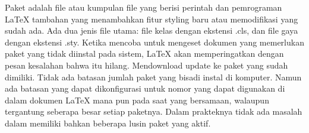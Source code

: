 \hspace{0.50in} Paket adalah file atau kumpulan file yang berisi perintah dan pemrograman LaTeX tambahan yang menambahkan fitur styling baru atau memodifikasi yang sudah ada. Ada dua jenis file utama: file kelas dengan ekstensi .cls, dan file gaya dengan ekstensi .sty. Ketika mencoba untuk mengeset dokumen yang memerlukan paket yang tidak diinstal pada sistem, LaTeX akan memperingatkan dengan pesan kesalahan bahwa itu hilang. Mendownload update ke paket yang sudah dimiliki. Tidak ada batasan jumlah paket yang bisadi instal di komputer. Namun ada batasan yang dapat dikonfigurasi untuk nomor yang dapat digunakan di dalam dokumen LaTeX mana pun pada saat yang bersamaan, walaupun tergantung seberapa besar setiap paketnya. Dalam prakteknya tidak ada masalah dalam memiliki bahkan beberapa lusin paket yang aktif.\par

